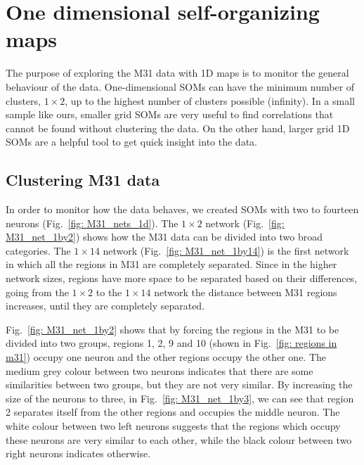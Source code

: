 \section{One dimensional self-organizing maps}
    \label{Sec: 1d_cluster}
    The purpose of  exploring the M31 data with 1D maps is to monitor the general behaviour of the data. 
    One-dimensional SOMs can have the minimum number of clusters, $1\times2$, up to the highest number of clusters possible (infinity).
    In a small sample like ours, smaller grid SOMs are very useful to find correlations that cannot be found without  clustering the data.
    On the other hand, larger grid 1D SOMs are a helpful tool to get quick insight into the data.

    \subsection{Clustering M31 data}%

        In order to monitor how the data behaves, we created SOMs with two to fourteen neurons (Fig.~\ref{fig: M31_nets_1d}).
        The $1\times2$ network (Fig.~\ref{fig: M31_net_1by2}) shows how the M31 data can be divided into two broad categories.
        The $1\times14$ network (Fig.~\ref{fig: M31_net_1by14}) is the first network in which all the regions in M31 are completely separated.
        Since in the higher network sizes, regions have more space to be separated based on their differences, going from the $1\times2$ to the $1\times14$ network the distance between M31 regions increases, until they are completely separated. 
        
        Fig.~\ref{fig: M31_net_1by2} shows that by forcing the regions in the M31 to be divided into two groups, regions 1, 2, 9 and 10 (shown in Fig.~\ref{fig: regions in m31}) occupy one neuron and the other regions occupy the other one.
        The medium grey colour between two neurons indicates that there are some similarities between two groups, but they are not very similar. 
        By increasing the size of the neurons to three, in Fig.~\ref{fig: M31_net_1by3}, we can see that region 2 separates itself from the other regions and occupies the middle neuron.
        The white colour between two left neurons suggests that the regions which occupy these neurons are very similar to each other, while the black colour between two right neurons indicates otherwise.
        
